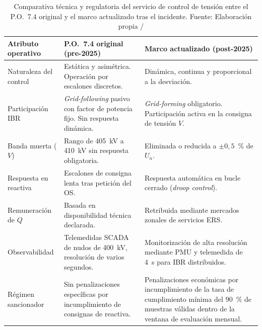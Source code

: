\begin{table}[H]
    \centering
    \caption[Comparativa del servicio de control de tensión: P.O.~7.4
    original y marco actualizado (CNMC, 2025).]{%
    Comparativa técnica y regulatoria del servicio de control de
    tensión entre el P.O.~7.4 original y el marco actualizado tras
    el incidente. Fuente: Elaboración propia / \cite{boe2025}}
    \vspace{0.3cm}
    \begin{tabularx}{\textwidth}{@{} l >{\RaggedRight\arraybackslash}X
                                      >{\RaggedRight\arraybackslash}X @{}}
        \toprule
        \textbf{Atributo operativo}
            & \textbf{P.O.~7.4 original (pre-2025)}
            & \textbf{Marco actualizado (post-2025)} \\
        \midrule
        Naturaleza del control
            & Estática y asimétrica. Operación por escalones discretos.
            & Dinámica, continua y proporcional a la desviación. \\
        \addlinespace
        Participación IBR
            & \textit{Grid-following} pasivo con factor de potencia fijo.
              Sin respuesta dinámica.
            & \textit{Grid-forming} obligatorio. Participación activa en
              la consigna de tensión $V$. \\
        \addlinespace
        Banda muerta ($V$)
            & Rango de 405~kV a 410~kV sin respuesta obligatoria.
            & Eliminada o reducida a $\pm 0{,}5$~\% de $U_n$. \\
        \addlinespace
        Respuesta en reactiva
            & Escalones de consigna lenta tras petición del OS.
            & Respuesta automática en bucle cerrado (\textit{droop
              control}). \\
        \addlinespace
        Remuneración de $Q$
            & Basada en disponibilidad técnica declarada.
            & Retribuida mediante mercados zonales de servicios ERS. \\
        \addlinespace
        Observabilidad
            & Telemedidas SCADA de nudos de 400~kV, resolución de
              varios segundos.
            & Monitorización de alta resolución mediante PMU y
              telemedida de 4~s para IBR distribuidos. \\
        \addlinespace
        Régimen sancionador
            & Sin penalizaciones específicas por incumplimiento de
              consignas de reactiva.
            & Penalizaciones económicas por incumplimiento de la tasa
              de cumplimiento mínima del 90~\% de muestras válidas
              dentro de la ventana de evaluación mensual. \\
        \bottomrule
    \end{tabularx}
    \label{tab:comparativa_normativa_po74_v2}
\end{table}

